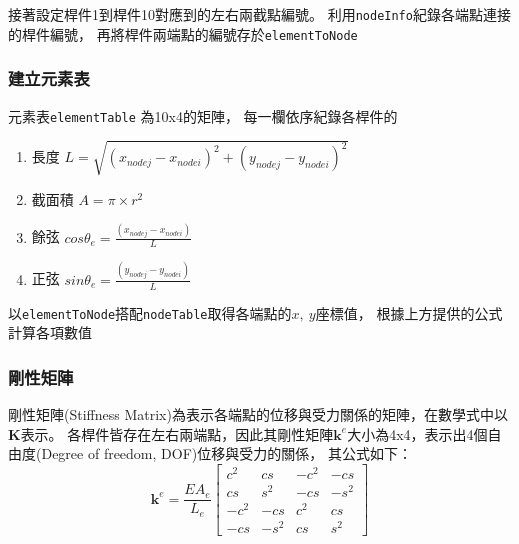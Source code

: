 \documentclass[12pt,a4paper]{article}
\begin{document}
            接著設定桿件1到桿件10對應到的左右兩截點編號。
            利用\texttt{nodeInfo}紀錄各端點連接的桿件編號，
            再將桿件兩端點的編號存於\texttt{elementToNode}
            
            

        \subsubsection{建立元素表}
            
            元素表\texttt{elementTable} 為10x4的矩陣，
            每一欄依序紀錄各桿件的
            \begin{enumerate}
                \item 長度 
                        \begin{math}
                            L=\sqrt{\left(x_{nodej}-x_{nodei}\right)^2+
                                    \left(y_{nodej}-y_{nodei}\right)^2}
                        \end{math}
                \item 截面積 $A=\pi\times r^2$
                \item 餘弦 $cos\theta_e=\displaystyle\frac{\left(x_{nodej}-x_{nodei}\right)}{L}$
                \item 正弦 $sin\theta_e=\displaystyle\frac{\left(y_{nodej}-y_{nodei}\right)}{L}$
            \end{enumerate}

            以\texttt{elementToNode}搭配\texttt{nodeTable}取得各端點的$x,\ y$座標值，
            根據上方提供的公式計算各項數值
            

        \newpage
        \subsubsection{剛性矩陣}

            剛性矩陣(Stiffness Matrix)為表示各端點的位移與受力關係的矩陣，在數學式中以$\mathbf{K}$表示。
            各桿件皆存在左右兩端點，因此其剛性矩陣$\mathbf{k}^e$大小為4x4，表示出4個自由度(Degree of freedom, DOF)位移與受力的關係，
            其公式如下：
            \begin{displaymath}
                \mathbf{k}^e = \frac{EA_e}{L_e}\left[
                    \begin{array}{cccc}
                        c^2 & cs & -c^2 & -cs\\
                        cs & s^2 & -cs & -s^2\\
                        -c^2 & -cs & c^2 & cs\\
                        -cs & -s^2 & cs & s^2
                    \end{array}\right]
            \end{displaymath}
\end{document}

